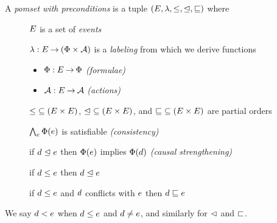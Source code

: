 \begin{definition}
  A \emph{pomset with preconditions} is a tuple
  $(E, \lambda, {\le}, {\trianglelefteq}, {\sqsubseteq})$ where
  \begin{description}
  \item[{}] $E$ is a set of \emph{events}
  \item[{}]
    $\lambda: E \mathbin\rightarrow (\Phi\times\mathcal{A})$ is a \emph{labeling} from
    which we derive functions
    \begin{itemize}
    \item $\Phi:E\mathbin\rightarrow\Phi$
      \emph{(formulae)} %
    \item $\mathcal{A}:E\mathbin\rightarrow\mathcal{A}$
      \emph{(actions)} %
    \end{itemize}
  \item[{}]
    ${\le} \subseteq (E\times E)$,
    ${\trianglelefteq} \subseteq (E\times E)$, and
    ${\sqsubseteq} \subseteq (E\times E)$ are partial orders
  \item[{}] $\bigwedge_{e}\Phi(e)$ is satisfiable \emph{(consistency)}
  \item[{}] if $d\trianglelefteq e$ then $\Phi(e)$ implies $\Phi(d)$ \emph{(causal strengthening)} 
  \item[{}] if $d\le e$ then $d\trianglelefteq e$
  \item[{}] if $d\le e$ and $d$ conflicts with $e$ then $d\sqsubseteq e$
  \end{description}
\end{definition}


  We say $d<e$ when $d\le e$ and $d\neq e$, and similarly
  for $\vartriangleleft$ and $\sqsubset$.



